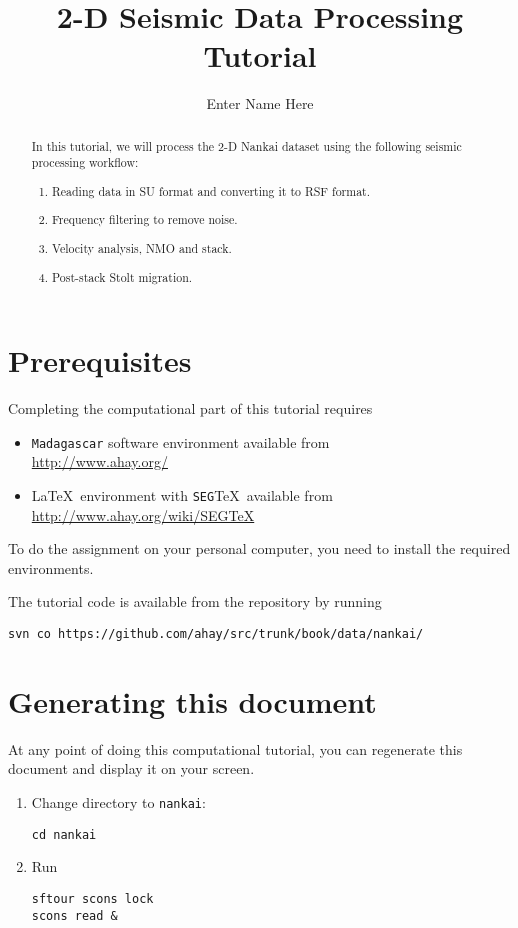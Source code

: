 \author{Enter Name Here}
\title{2-D Seismic Data Processing Tutorial}

\begin{abstract}
  In this tutorial, we will process the 2-D Nankai dataset using the following seismic processing workflow:
  \begin{enumerate}
  \item Reading data in SU format and converting it to RSF format. 
  \item Frequency filtering to remove noise.
  \item Velocity analysis, NMO and stack.
  \item Post-stack Stolt migration.
  \end{enumerate}
\end{abstract}

\section{Prerequisites}

Completing the computational part of this tutorial requires
\begin{itemize}
\item \texttt{Madagascar} software environment available from \\
\url{http://www.ahay.org/}
\item \LaTeX\ environment with \texttt{SEG}\TeX\ available from \\ 
\url{http://www.ahay.org/wiki/SEGTeX}
\end{itemize}
To do the assignment on your personal computer, you need to install
the required environments. 

The tutorial code is available from the repository
by running
\begin{verbatim}
svn co https://github.com/ahay/src/trunk/book/data/nankai/
\end{verbatim}

\section{Generating this document}

At any point of doing this computational tutorial, you can
regenerate this document and display it on your screen.

\begin{enumerate}          
\item Change directory to \texttt{nankai}:
\begin{verbatim}
cd nankai
\end{verbatim}
\item Run
\begin{verbatim}
sftour scons lock
scons read &
\end{verbatim}
\end{enumerate}

